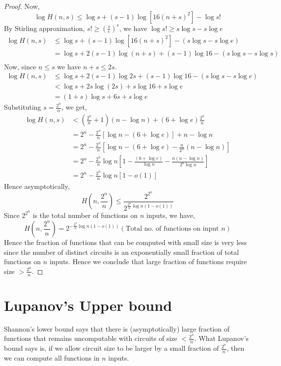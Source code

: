 \begin{proof}
Now, 
\[ \log H(n,s) \le \log s + (s-1)\log [16(n+s)^2] - \log s! \]
By Stirling approximation, $s! \ge \left ( \frac{s}{e} \right )^s$, we have
$\log s! \ge s\log s- s\log e$
\begin{align*}
\log H(n,s) & \le \log s + (s-1)\log[16(n+s)^2] - (s\log s -s \log e) \\
 & = \log s + 2(s-1) \log (n+s) + (s-1) \log 16 -(s\log s -s\log s) \\
\end{align*}
Now, since $n \le s$ we have $n+s \le 2s$.
\begin{align*}
\log H(n,s) & \le \log s + 2(s-1)\log 2s + (s-1)\log 16 - (s\log s - s\log e)
\\
& < \log s + 2s\log (2s) + s \log 16 + s\log e \\
& = (1+s)\log s + 6s + s\log e
\end{align*}
Substituting $s = \frac{2^n}{n}$, we get,
\begin{align*}
\log H(n,s) & <  \left ( \frac{2^n}{n}+1 \right ) (n-\log n) + (6 + \log e)
\frac{2^n}{n} \\
& = 2^n -\frac{2^n}{n}[\log n - (6 + \log e)] + n - \log n \\
& = 2^n - \frac{2^n}{n} \left [ \log n - (6+\log e) - \frac{n}{2^n}(n-\log n) 
\right ] \\
& = 2^n -\frac{2^n}{n} \log n \left [ 1 - \frac{(6+\log e)}{\log n} -
\frac{n(n-\log n)}{2^n\log n}  \right ] \\
& = 2^n - \frac{2^n}{n} \log n [1 - o(1)]
\end{align*}
Hence asymptotically,
\[ H\left (n, \frac{2^n}{n}\right ) \le \frac{2^{2^n}}{2^{\frac{2^n}{n} \log n (1 - o(1))}}
\]
Since $2^{2^n}$ is the total number of functions on $n$ inputs, we have,
\[ H\left (n,\frac{2^n}{n}\right  ) = 2^{-\frac{2^n}{n} \log n
(1-o(1))}(\text{Total no. of functions on input } n) \]
Hence the fraction of functions that can be computed with small size is very
less since the number of distinct circuits is an exponentially small fraction
of total functions on $n$ inputs. Hence we conclude that large fraction of
functions require size $ > \frac{2^n}{n}$.
\end{proof}

\section{Lupanov's Upper bound}
Shannon's lower bound says that there is (asymptotically) large fraction 
of functions that remains uncomputable with circuits of size 
$ < \frac{2^n}{n}$. What Lupanov's bound says is, if we allow circuit size to
be larger by a small fraction of $\frac{2^n}{n}$, then we can compute
all functions in $n$ inputs.

